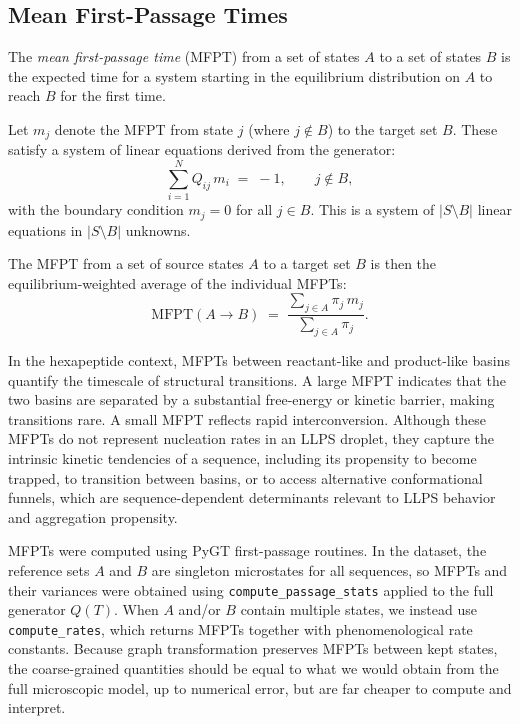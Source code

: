 \subsection{Mean First-Passage Times}\label{subsec:mfpt}

The \emph{mean first-passage time} (MFPT) from a set of states $A$ to a set of
states $B$ is the expected time for a system starting in the equilibrium distribution
on $A$ to reach $B$ for the first time.

Let $m_j$ denote the MFPT from state $j$ (where $j \notin B$) to the target set $B$.
These satisfy a system of linear equations derived from the generator:
\begin{equation}\label{eq:mfpt-linear-system}
  \sum_{i=1}^{N} Q_{ij}\, m_i \;=\; -1, \qquad j \notin B,
\end{equation}
with the boundary condition $m_j = 0$ for all $j \in B$. This is a system of
$|S \setminus B|$ linear equations in $|S \setminus B|$ unknowns.

The MFPT from a set of source states $A$ to a target set $B$ is then the
equilibrium-weighted average of the individual MFPTs:
\begin{equation}\label{eq:mfpt-AB}
  \mathrm{MFPT}(A \to B)
  \;=\;
  \frac{\sum_{j \in A} \pi_j\, m_j}{\sum_{j \in A} \pi_j}.
\end{equation}

In the hexapeptide context, MFPTs between reactant-like and product-like basins
quantify the timescale of structural transitions. A large MFPT indicates that the two
basins are separated by a substantial free-energy or kinetic barrier, making
transitions rare. A small MFPT reflects rapid interconversion. Although these MFPTs
do not represent nucleation rates in an LLPS droplet, they capture the intrinsic
kinetic tendencies of a sequence, including its propensity to become trapped, to
transition between basins, or to access alternative conformational funnels, which are
sequence-dependent determinants relevant to LLPS behavior and aggregation propensity.

MFPTs were computed using PyGT first-passage routines. In the dataset, the reference
sets $A$ and $B$ are singleton microstates for all sequences, so MFPTs and their
variances were obtained using \texttt{compute\_passage\_stats} applied to the full
generator $Q(T)$. When $A$ and/or $B$ contain multiple states, we instead use
\texttt{compute\_rates}, which returns MFPTs together with phenomenological rate
constants. Because graph transformation preserves MFPTs between kept states, the
coarse-grained quantities should be equal to what we would obtain from the full
microscopic model, up to numerical error, but are far cheaper to compute and interpret.


